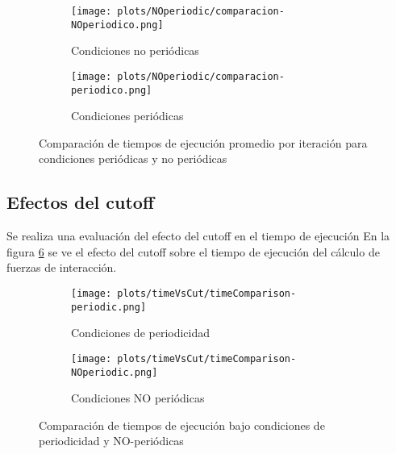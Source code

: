 \begin{figure}[htbp]
\centering
\begin{subfigure}[b]{\plotwidthtres}
   \texttt{[image: plots/NOperiodic/comparacion-NOperiodico.png]}
   \caption{Condiciones no periódicas}
   \label{compar-1iter-promedio}
 \end{subfigure}
\begin{subfigure}[b]{\plotwidthtres}
   \texttt{[image: plots/NOperiodic/comparacion-periodico.png]}
   \caption{Condiciones periódicas}
   \label{compar-niter-promedio}
 \end{subfigure}
 \caption{Comparaci\'on de tiempos de ejecuci\'on promedio por iteración para condiciones periódicas y no periódicas}
 \label{periodic-effects}
\end{figure}


\subsection{Efectos del cutoff}
Se realiza una evaluación del efecto del cutoff en el tiempo de ejecución
En la figura \ref{time-vs-cut} se ve el efecto del cutoff sobre el tiempo de ejecución del cálculo de fuerzas de interacción.



\begin{figure}[htbp]
\centering
\begin{subfigure}[b]{\plotwidthtres}
   \texttt{[image: plots/timeVsCut/timeComparison-periodic.png]}
   \caption{Condiciones de periodicidad}
   \label{compar-1iter}
 \end{subfigure}
\begin{subfigure}[b]{\plotwidthtres}
   \texttt{[image: plots/timeVsCut/timeComparison-NOperiodic.png]}
   \caption{Condiciones NO periódicas}
   \label{compar-niter}
 \end{subfigure}
 \caption{Comparaci\'on de tiempos de ejecuci\'on bajo condiciones de periodicidad y NO-periódicas}
 \label{time-vs-cut}
\end{figure}


